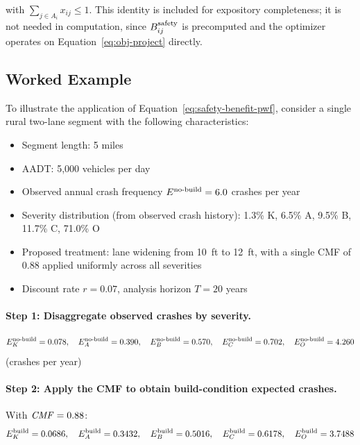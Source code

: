 \noindent with $\sum_{j \in A_i} x_{ij} \leq 1$. This identity is included
for expository completeness; it is not needed in computation, since
$B^{\mathrm{safety}}_{ij}$ is precomputed and the optimizer operates on
Equation~\ref{eq:obj-project} directly.

\subsection{Worked Example}
\label{sec:safety-worked-example}

To illustrate the application of Equation~\ref{eq:safety-benefit-pwf},
consider a single rural two-lane segment with the following characteristics:

\begin{itemize}[leftmargin=2em, itemsep=2pt]
  \item Segment length: 5 miles
  \item AADT: 5{,}000 vehicles per day
  \item Observed annual crash frequency $E^{\mathrm{no\text{-}build}} = 6.0$ crashes per year
  \item Severity distribution (from observed crash history):
    1.3\% K, 6.5\% A, 9.5\% B, 11.7\% C, 71.0\% O
  \item Proposed treatment: lane widening from 10~ft to 12~ft, with a single
    CMF of $0.88$ applied uniformly across all severities
  \item Discount rate $r = 0.07$, analysis horizon $T = 20$ years
\end{itemize}

\paragraph{Step 1: Disaggregate observed crashes by severity.}
\[
E^{\mathrm{no\text{-}build}}_K = 0.078,\quad
E^{\mathrm{no\text{-}build}}_A = 0.390,\quad
E^{\mathrm{no\text{-}build}}_B = 0.570,\quad
E^{\mathrm{no\text{-}build}}_C = 0.702,\quad
E^{\mathrm{no\text{-}build}}_O = 4.260
\]
\quad (crashes per year)

\paragraph{Step 2: Apply the CMF to obtain build-condition expected crashes.}
With $\mathit{CMF} = 0.88$:
\[
E^{\mathrm{build}}_K = 0.0686,\quad
E^{\mathrm{build}}_A = 0.3432,\quad
E^{\mathrm{build}}_B = 0.5016,\quad
E^{\mathrm{build}}_C = 0.6178,\quad
E^{\mathrm{build}}_O = 3.7488
\]

